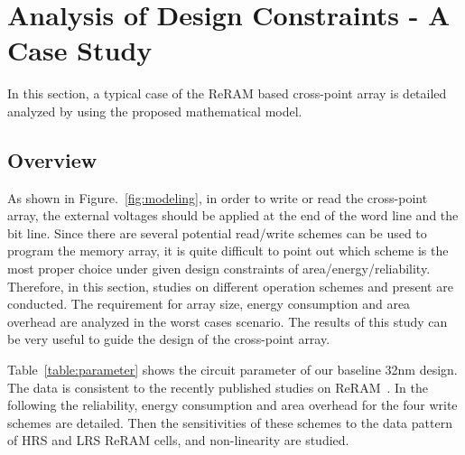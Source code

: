 \vspace{10pt}
\section{Analysis of Design Constraints - A Case Study}\label{sec:w_and_r}

In this section, a typical case of the ReRAM based cross-point array is detailed analyzed by using the proposed mathematical model. 

\subsection{Overview}
As shown in Figure.~\ref{fig:modeling}, in order to write or read the
cross-point array, the external voltages should be applied at the end of
the word line and the bit line. Since there are several potential
read/write schemes can be used to program the memory array, it is
quite difficult to point out which scheme is the most proper choice under given design constraints of area/energy/reliability. Therefore, in this section, studies on different operation schemes and present are conducted. The requirement for array size, energy consumption and area overhead are analyzed in the worst cases scenario. The results of this study can be very useful to guide the design of the cross-point array.


Table~\ref{table:parameter} shows the circuit parameter of our baseline 32nm design. The data is consistent to the recently published studies on ReRAM~\cite{crossbar_TED_2010}\cite{memristor:Cong}. In the following the
reliability, energy consumption and area overhead for the four write
schemes are detailed. Then the sensitivities of these schemes to the data
pattern of HRS and LRS ReRAM cells, and non-linearity are studied.

